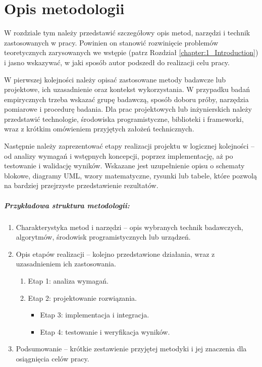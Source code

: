 \chapter[Opis metodologii (Imię i Nazwisko autora rozdziału w przypadku pracy zbiorowej)]{Opis metodologii}\label{chapter:2_Methodology} 

W rozdziale tym należy przedstawić szczegółowy opis metod, narzędzi i technik zastosowanych w pracy. Powinien on stanowić rozwinięcie problemów teoretycznych zarysowanych we wstępie (patrz Rozdział \ref{chapter:1_Introduction}) i jasno wskazywać, w jaki sposób autor podszedł do realizacji celu pracy.

W pierwszej kolejności należy opisać zastosowane metody badawcze lub projektowe, ich uzasadnienie oraz kontekst wykorzystania. W przypadku badań empirycznych trzeba wskazać grupę badawczą, sposób doboru próby, narzędzia pomiarowe i procedurę badania. Dla prac projektowych lub inżynierskich należy przedstawić technologie, środowiska programistyczne, biblioteki i frameworki, wraz z krótkim omówieniem przyjętych założeń technicznych.

Następnie należy zaprezentować etapy realizacji projektu w logicznej kolejności – od analizy wymagań i wstępnych koncepcji, poprzez implementację, aż po testowanie i walidację wyników. Wskazane jest uzupełnienie opisu o schematy blokowe, diagramy UML, wzory matematyczne, rysunki lub tabele, które pozwolą na bardziej przejrzyste przedstawienie rezultatów.

\paragraph{Przykładowa struktura metodologii:} 
\begin{enumerate}
    \item Charakterystyka metod i narzędzi – opis wybranych technik badawczych, algorytmów, środowisk programistycznych lub urządzeń.
    \item Opis etapów realizacji – kolejno przedstawione działania, wraz z uzasadnieniem ich zastosowania.
    \begin{enumerate}[label=\alph*)]
        \item Etap 1: analiza wymagań.
        \item Etap 2: projektowanie rozwiązania.
        \begin{itemize}
            \item Etap 3: implementacja i integracja.
            \item Etap 4: testowanie i weryfikacja wyników.
        \end{itemize}
    \end{enumerate}
    \item Podsumowanie – krótkie zestawienie przyjętej metodyki i jej znaczenia dla osiągnięcia celów pracy.
\end{enumerate}

